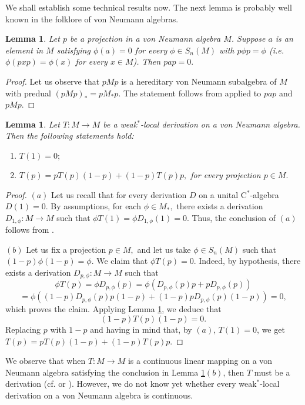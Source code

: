 \documentclass[11pt]{amsart}
\newtheorem{lemma}[theorem]{Lemma}
\begin{document}
We shall establish some technical results now. The next lemma is probably well known in the folklore of von Neumann algebras.

\begin{lemma}\label{l one} Let $p$ be a projection in a von Neumann algebra $M$. Suppose $a$ is an element in $M$ satisfying $\phi (a) = 0$ for every $\phi \in S_n (M)$ with $p\phi p = \phi$ {\rm(}i.e. $\phi (px p) = \phi (x)$ for every $x\in M${\rm)}. Then $p a p =0.$
\end{lemma}

\begin{proof} Let us observe that $pMp$ is a hereditary von Neumann subalgebra of $M$ with predual $(pMp)_* =p M_* p$. The statement follows from \cite[Lemma 1.7.2]{Sak} applied to $pap$ and $pMp.$
\end{proof}

\begin{lemma}\label{l two} Let $T: M\to M$ be a weak$^*$-local derivation on a von Neumann algebra. Then the following statements hold:\begin{enumerate}[$(a)$]\item $T(1) =0;$
\item $T(p) = p T(p) (1-p) + (1-p) T(p) p,$ for every projection $p\in M.$
\end{enumerate}
\end{lemma}

\begin{proof}
$(a)$ Let us recall that for every derivation $D$ on a unital C$^*$-algebra $D(1)=0.$ By assumptions, for each $\phi \in M_*,$ there exists a derivation $D_{1,\phi} :M\to M$ such that $\phi T(1) = \phi D_{1,\phi} (1) =0.$ Thus, the conclusion of $(a)$ follows from \cite[Lemma 1.7.2]{Sak}.\smallskip

$(b)$ Let us fix a projection $p\in M,$ and let us take $\phi\in S_n(M)$ such that $(1-p)\phi (1-p) =\phi$. We claim that $\phi T(p) =0.$ Indeed, by hypothesis, there exists a derivation $D_{p,\phi} :M\to M$ such that $$\phi T(p) = \phi D_{p,\phi} (p) = \phi (D_{p,\phi} (p) p + p D_{p,\phi} (p))$$ $$ =\phi ((1-p) D_{p,\phi} (p) p (1-p) + (1-p) p D_{p,\phi} (p)(1-p)) =0 ,$$ which proves the claim. Applying Lemma \ref{l one}, we deduce that $$(1-p) T(p) (1-p)=0.$$ Replacing $p$ with $1-p$ and having in mind that, by $(a)$, $T(1)=0$, we get $T(p) = p T(p) (1-p) + (1-p) T(p) p.$
\end{proof}

We observe that when $T:M\to M$ is a continuous linear mapping on a von Neumann algebra satisfying the conclusion in Lemma \ref{l two}$(b)$, then $T$ must be a derivation (cf. \cite[Theorem 2]{Bre92} or \cite[Proof of Theorem 2.1]{AyuKudPe2014}). However, we do not know yet whether every weak$^*$-local derivation on a von Neumann algebra is continuous.\smallskip
\end{document}
